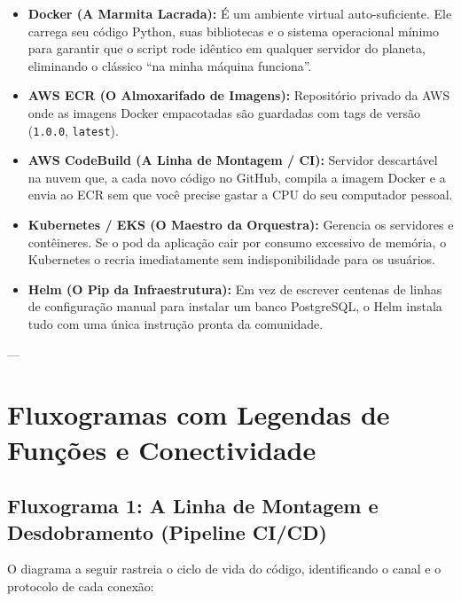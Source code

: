 \documentclass[11pt,a4paper]{article}
\begin{document}
\begin{itemize}[leftmargin=*]
    \item \textbf{Docker (A Marmita Lacrada):} É um ambiente virtual auto-suficiente. Ele carrega seu código Python, suas bibliotecas e o sistema operacional mínimo para garantir que o script rode idêntico em qualquer servidor do planeta, eliminando o clássico ``na minha máquina funciona''.
    \item \textbf{AWS ECR (O Almoxarifado de Imagens):} Repositório privado da AWS onde as imagens Docker empacotadas são guardadas com tags de versão (\texttt{1.0.0}, \texttt{latest}).
    \item \textbf{AWS CodeBuild (A Linha de Montagem / CI):} Servidor descartável na nuvem que, a cada novo código no GitHub, compila a imagem Docker e a envia ao ECR sem que você precise gastar a CPU do seu computador pessoal.
    \item \textbf{Kubernetes / EKS (O Maestro da Orquestra):} Gerencia os servidores e contêineres. Se o pod da aplicação cair por consumo excessivo de memória, o Kubernetes o recria imediatamente sem indisponibilidade para os usuários.
    \item \textbf{Helm (O Pip da Infraestrutura):} Em vez de escrever centenas de linhas de configuração manual para instalar um banco PostgreSQL, o Helm instala tudo com uma única instrução pronta da comunidade.
\end{itemize}

---

\section{Fluxogramas com Legendas de Funções e Conectividade}

\subsection{Fluxograma 1: A Linha de Montagem e Desdobramento (Pipeline CI/CD)}
O diagrama a seguir rastreia o ciclo de vida do código, identificando o canal e o protocolo de cada conexão:
\end{document}
